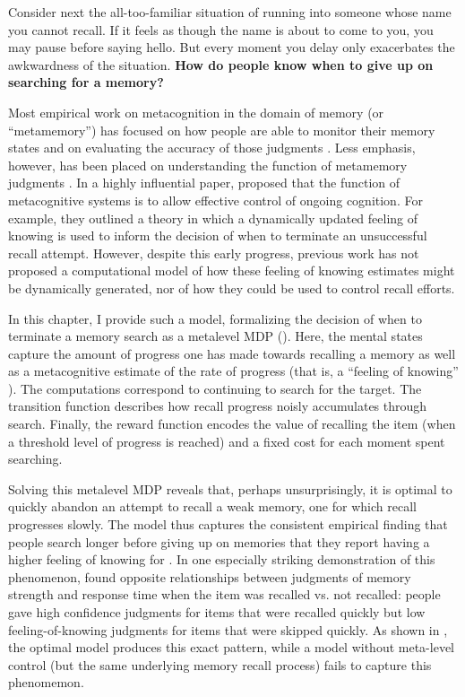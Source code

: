 \documentclass[11pt,a4paperpaper,]{article}
\begin{document}
Consider next the all-too-familiar situation of running into someone whose name you cannot recall. If it feels as though the name is about to come to you, you may pause before saying hello. But every moment you delay only exacerbates the awkwardness of the situation. \textbf{How do people know when to give up on searching for a memory?}

Most empirical work on metacognition in the domain of memory (or ``metamemory'') has focused on how people are able to monitor their memory states \citep{reder1992determines,eakin2005illusions} and on evaluating the accuracy of those judgments \citep{hart1965memory,vesonder1985ability,dunlosky2007metacomprehension}. Less emphasis, however, has been placed on understanding the function of metamemory judgments \citep{schwartz2017metamemory}. In a highly influential paper, \citet{nelson1990metamemory} proposed that the function of metacognitive systems is to allow effective control of ongoing cognition. For example, they outlined a theory in which a dynamically updated feeling of knowing is used to inform the decision of when to terminate an unsuccessful recall attempt. However, despite this early progress, previous work has not proposed a computational model of how these feeling of knowing estimates might be dynamically generated, nor of how they could be used to control recall efforts. 

In this chapter, I provide such a model, formalizing the decision of when to terminate a memory search as a metalevel MDP (). Here, the mental states capture the amount of progress one has made towards recalling a memory as well as a metacognitive estimate of the rate of progress (that is, a ``feeling of knowing'' \citealp{hart1965memory}). The computations correspond to continuing to search for the target. The transition function describes how recall progress noisly accumulates through search. Finally, the reward function encodes the value of recalling the item (when a threshold level of progress is reached) and a fixed cost for each moment spent searching.

Solving this metalevel MDP reveals that, perhaps unsurprisingly, it is optimal to quickly abandon an attempt to recall a weak memory, one for which recall progresses slowly. The model thus captures the consistent empirical finding that people search longer before giving up on memories that they report having a higher feeling of knowing for \citealp{nelson1984comparison,nhouyvanisvong1998rapid,gruneberg1977methodological,lachman1979metamemory}. In one especially striking demonstration of this phenomenon, \citet{costermans1992confidence} found opposite relationships between judgments of memory strength and response time when the item was recalled vs. not recalled: people gave high confidence judgments for items that were recalled quickly but low feeling-of-knowing judgments for items that were skipped quickly. As shown in , the optimal model produces this exact pattern, while a model without meta-level control (but the same underlying memory recall process) fails to capture this phenomemon.
\end{document}
